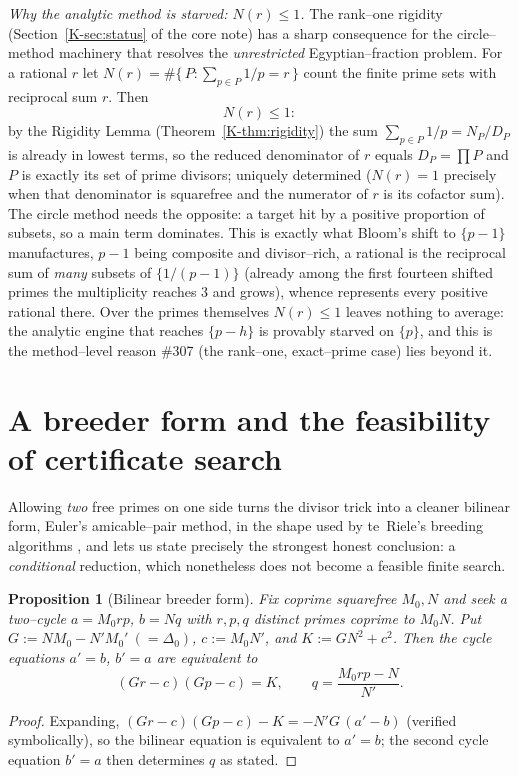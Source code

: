 \documentclass[11pt]{article}
\newtheorem{proposition}[theorem]{Proposition}
\theoremstyle{definition}
\begin{document}
\emph{Why the analytic method is starved: $N(r)\le1$.} The rank--one rigidity (Section~\ref{K-sec:status} of the core note) has a sharp consequence for the circle--method
machinery that resolves the \emph{unrestricted} Egyptian--fraction problem. For a rational $r$ let
$N(r)=\#\{\,P:\sum_{p\in P}1/p=r\,\}$ count the finite prime sets with reciprocal sum $r$. Then
\[N(r)\le1:\]
by the Rigidity Lemma (Theorem~\ref{K-thm:rigidity}) the sum $\sum_{p\in P}1/p=N_P/D_P$ is already in
lowest terms, so the reduced denominator of $r$ equals $D_P=\prod P$ and $P$ is exactly its set of
prime divisors; uniquely determined ($N(r)=1$ precisely when that denominator is squarefree and the
numerator of $r$ is its cofactor sum). The circle method needs the opposite: a target hit by a positive
proportion of subsets, so a main term dominates. This is exactly what Bloom's shift to $\{p-1\}$
manufactures, $p-1$ being composite and divisor--rich, a rational is the reciprocal sum of
\emph{many} subsets of $\{1/(p-1)\}$ (already among the first fourteen shifted primes the multiplicity
reaches $3$ and grows), whence \cite{BloomShifted} represents every positive rational there. Over the
primes themselves $N(r)\le1$ leaves nothing to average: the analytic engine that reaches $\{p-h\}$ is
provably starved on $\{p\}$, and this is the method--level reason \#307 (the rank--one, exact--prime
case) lies beyond it.


\section{A breeder form and the feasibility of certificate search}\label{sec:breeder}

Allowing \emph{two} free primes on one side turns the divisor trick into a cleaner bilinear form,
Euler's amicable--pair method, in the shape used by te~Riele's breeding algorithms
\cite{teRiele1984}, and lets us state precisely the strongest honest conclusion: a
\emph{conditional} reduction, which nonetheless does not become a feasible finite search.

\begin{proposition}[Bilinear breeder form]\label{prop:bde}
Fix coprime squarefree $M_0,N$ and seek a two--cycle $a=M_0rp$, $b=Nq$ with $r,p,q$ distinct primes
coprime to $M_0N$. Put $G:=NM_0-N'M_0'\ (=\Delta_0)$, $c:=M_0N'$, and $K:=GN^2+c^2$. Then the cycle
equations $a'=b$, $b'=a$ are equivalent to
\[
(Gr-c)(Gp-c)=K, \qquad q=\frac{M_0rp-N}{N'}.
\]
\end{proposition}
\begin{proof}
Expanding, $(Gr-c)(Gp-c)-K=-N'G\,(a'-b)$ (verified symbolically), so the bilinear equation is
equivalent to $a'=b$; the second cycle equation $b'=a$ then determines $q$ as stated.
\end{proof}
\end{document}
